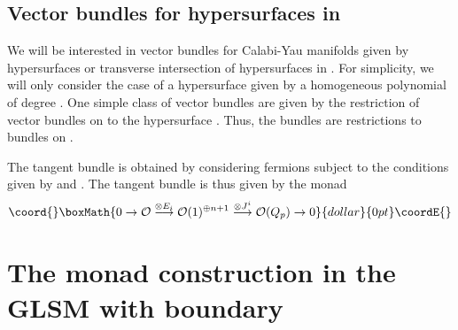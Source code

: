 \documentclass[a4paper,12pt]{article}
\def\Bbb{\mathbb}
\def\BT{\Bbb T}
\begin{document}
\subsection{Vector bundles for hypersurfaces in \coordHE{}}

We will be interested in vector bundles for Calabi-Yau manifolds given by
hypersurfaces or transverse intersection of hypersurfaces in \coordHE{}. 
For simplicity, we will only consider the case of a hypersurface \coordHE{} given by
a homogeneous polynomial \coordHE{} of degree \coordHE{}.  
One simple class of vector bundles are given by
the restriction \coordHE{} of vector bundles on \coordHE{} to the hypersurface \coordHE{}.
Thus, the \coordHE{} bundles are restrictions to bundles on \coordHE{}. 

The tangent bundle \myHighlight{$\BT_M$}\coordHE{} is obtained by considering \coordHE{} fermions
subject to the conditions given by \coordHE{} and \coordHE{}. The tangent bundle is thus given by the monad
$$\coord{}\boxMath{
0\rightarrow {\cal O}\stackrel{\otimes E_i}{\longrightarrow}
 {\cal O}(1)^{\oplus n+1}\stackrel{\otimes J^i}{\longrightarrow}
{\cal O}(Q_p)\rightarrow 0
}{dollar}{0pt}\coordE{}$$
 

\section{\large The monad construction in the GLSM with boundary}
\end{document}
